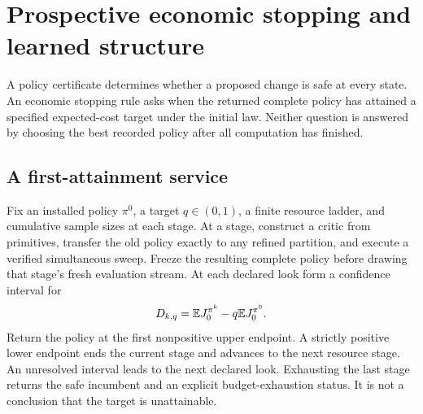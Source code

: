 \section{Prospective economic stopping and learned structure}\label{sec:prospective56}
A policy certificate determines whether a proposed change is safe at every state. An economic stopping rule asks when the returned complete policy has attained a specified expected-cost target under the initial law. Neither question is answered by choosing the best recorded policy after all computation has finished.

\subsection{A first-attainment service}
Fix an installed policy $\pi^0$, a target $q\in(0,1)$, a finite resource ladder, and cumulative sample sizes at each stage. At a stage, construct a critic from primitives, transfer the old policy exactly to any refined partition, and execute a verified simultaneous sweep. Freeze the resulting complete policy before drawing that stage's fresh evaluation stream. At each declared look form a confidence interval for
\begin{equation}\label{eq:target56}
 D_{k,q}=\mathbb E J_0^{\pi^k}-q\mathbb E J_0^{\pi^0}.
\end{equation}
Return the policy at the first nonpositive upper endpoint. A strictly positive lower endpoint ends the current stage and advances to the next resource stage. An unresolved interval leads to the next declared look. Exhausting the last stage returns the safe incumbent and an explicit budget-exhaustion status. It is not a conclusion that the target is unattainable.

